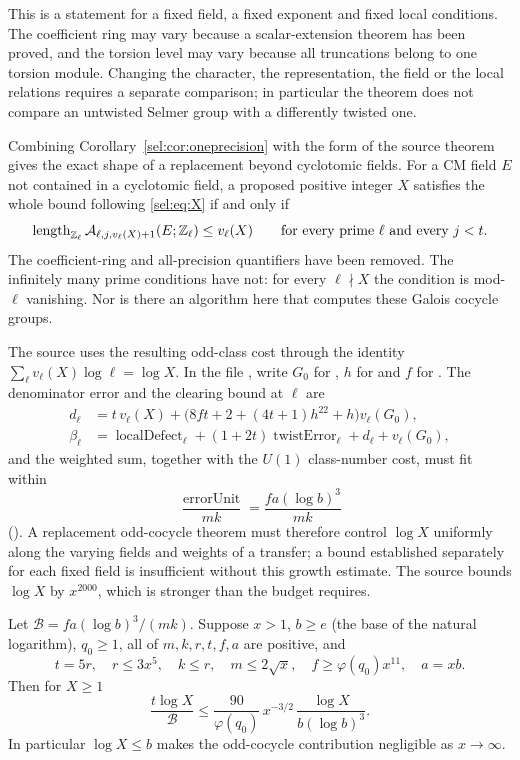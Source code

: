 This is a statement for a fixed field, a fixed exponent and fixed local
conditions. The coefficient ring may vary because a scalar-extension theorem
has been proved, and the torsion level may vary because all truncations
belong to one torsion module. Changing the character, the representation,
the field or the local relations requires a separate comparison; in
particular the theorem does not compare an untwisted Selmer group with a
differently twisted one.

Combining Corollary~\ref{sel:cor:oneprecision} with the form of the source theorem
gives the exact shape of a replacement beyond cyclotomic fields. For a CM
field $E$ not contained in a cyclotomic field, a proposed positive integer
$X$ satisfies the whole bound following \eqref{sel:eq:X} if and only if
\begin{equation}\label{sel:eq:target}
 \operatorname{length}_{\mathbb{Z}_\ell}\mathcal{A}_{\ell,j,v_\ell(X)+1}(E;\mathbb{Z}_\ell)\le v_\ell(X)
 \qquad\text{for every prime }\ell\text{ and every }j<t .
\end{equation}
The coefficient-ring and all-precision quantifiers have been removed. The
infinitely many prime conditions have not: for every $\ell\nmid X$ the
condition is mod-$\ell$ vanishing. Nor is there an algorithm here that
computes these Galois cocycle groups.

The source uses the resulting odd-class cost through the identity
$\sum_\ell v_\ell(X)\log\ell=\log X$. In the file
, write $G_0$ for , $h$
for  and $f$ for . The denominator error
and the clearing bound at $\ell$ are
\begin{align*}
 d_\ell&=t\,v_\ell(X)+\bigl(8ft+2+(4t+1)h^{22}+h\bigr)v_\ell(G_0),\\
 \beta_\ell&=\operatorname{localDefect}_\ell
 +(1+2t)\operatorname{twistError}_\ell+d_\ell+v_\ell(G_0),
\end{align*}
and the weighted sum, together with the $U(1)$ class-number cost, must fit
within
\[
 \frac{\operatorname{errorUnit}}{mk}=\frac{fa(\log b)^3}{mk}
\]
(). A replacement odd-cocycle theorem must
therefore control $\log X$ uniformly along the varying fields and weights
of a transfer; a bound established separately for each fixed field is
insufficient without this growth estimate. The source bounds $\log X$ by
$x^{2000}$, which is stronger than the budget requires.

\begin{proposition}\label{sel:prop:growth}
Let $\mathcal B=fa(\log b)^3/(mk)$. Suppose $x>1$, $b\ge e$ (the base of
the natural logarithm), $q_0\ge1$, all of $m,k,r,t,f,a$ are positive, and
\[
 t=5r,\quad r\le3x^5,\quad k\le r,\quad m\le2\sqrt x,\quad
 f\ge\varphi(q_0)x^{11},\quad a=xb .
\]
Then for $X\ge1$
\begin{equation}\label{sel:eq:growth}
 \frac{t\log X}{\mathcal B}\le\frac{90}{\varphi(q_0)}\,x^{-3/2}\,
 \frac{\log X}{b(\log b)^3}.
\end{equation}
In particular $\log X\le b$ makes the odd-cocycle contribution negligible
as $x\to\infty$.
\end{proposition}

